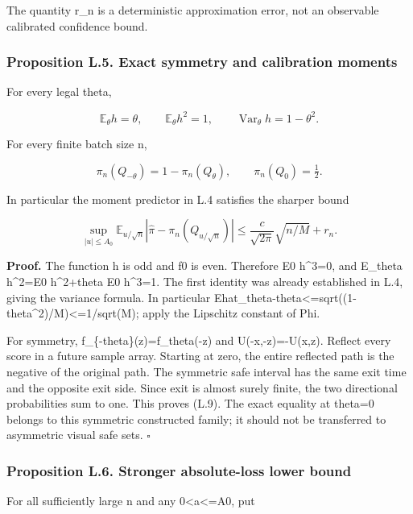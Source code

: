 The quantity r\_n is a deterministic approximation error, not an
observable calibrated confidence bound.

\subsubsection{Proposition L.5. Exact symmetry and calibration
moments}\label{local_prediction-proposition-l.5.-exact-symmetry-and-calibration-moments}

For every legal theta,

\[
\mathbb E_\theta h=\theta,\qquad
\mathbb E_\theta h^2=1,\qquad
\operatorname{Var}_\theta h=1-\theta^2.
\tag{L.8}
\]

For every finite batch size n,

\[
\pi_n(Q_{-\theta})=1-\pi_n(Q_\theta),
\qquad \pi_n(Q_0)=\tfrac12.
\tag{L.9}
\]

In particular the moment predictor in L.4 satisfies the sharper bound

\[
\sup_{|u|\le A_0}\mathbb E_{u/\sqrt n}
 |\widehat\pi-\pi_n(Q_{u/\sqrt n})|
\le\frac{c}{\sqrt{2\pi}}\sqrt{n/M}+r_n.
\tag{L.10}
\]

\textbf{Proof.} The function h is odd and f0 is even. Therefore E0
h\^{}3=0, and E\_theta h\^{}2=E0 h\^{}2+theta E0 h\^{}3=1. The first
identity was already established in L.4, giving the variance formula. In
particular
E\textbar hat\_theta-theta\textbar\textless=sqrt((1-theta\^{}2)/M)\textless=1/sqrt(M);
apply the Lipschitz constant of Phi.

For symmetry, f\_\{-theta\}(z)=f\_theta(-z) and U(-x,-z)=-U(x,z).
Reflect every score in a future sample array. Starting at zero, the
entire reflected path is the negative of the original path. The
symmetric safe interval has the same exit time and the opposite exit
side. Since exit is almost surely finite, the two directional
probabilities sum to one. This proves (L.9). The exact equality at
theta=0 belongs to this symmetric constructed family; it should not be
transferred to asymmetric visual safe sets. \(\square\)

\subsubsection{Proposition L.6. Stronger absolute-loss lower
bound}\label{local_prediction-proposition-l.6.-stronger-absolute-loss-lower-bound}

For all sufficiently large n and any 0\textless a\textless=A0, put

